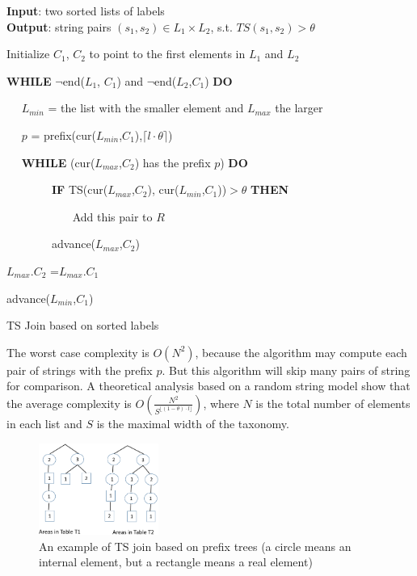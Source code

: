 \begin{algorithm}
{\bf Input}: two sorted lists of labels \\
{\bf Output}: string pairs $(s_1,s_2) \in L_1 \times L_2$, s.t. $TS(s_1, s_2) > \theta$
\begin{compactenum}[(1)]
\item Initialize  $C_1$, $C_2$ to point to the first elements in $L_1$ and $L_2$
\item {\bf WHILE}  $\neg$end($L_1$, $C_1$) and $\neg$end($L_2$,$C_1$) {\bf DO}
\item ~~ $L_{min}$ = the list with the smaller element and $L_{max}$ the larger
\item ~~ $p$ = prefix(cur($L_{min}$,$C_1$),$  \lceil l \cdot \theta \rceil$)
\item ~~ {\bf WHILE} (cur($L_{max}$,$C_2$) has the prefix $p$) {\bf DO}
\item ~~ ~~ ~~ {\bf IF} TS(cur($L_{max}$,$C_2$), cur($L_{min}$,$C_1$))$> \theta$ {\bf THEN}
\item ~~~   ~~ ~~ ~~ Add this pair to $R$
\item ~~ ~~ ~~  advance($L_{max}$,$C_2$)
\item $L_{max}.C_2$ =$L_{max}.C_1$
\item advance($L_{min}$,$C_1$)
\end{compactenum}
\caption{TS Join based on sorted labels}
\label{alg:exactjoin}
\end{algorithm}

The worst case complexity is $O(N^2)$, because the algorithm may compute each pair of strings with the prefix $p$. But this algorithm will skip many pairs of string for comparison. A theoretical analysis based on a random string model show that the average complexity is $O(\frac{N^2}{S^{\lfloor (1-\theta) \cdot l \rfloor}})$, where $N$ is the total number of elements in each list and $S$ is the maximal width of the taxonomy.


\begin{figure}[t]
\centering
\includegraphics[width=0.35\textwidth]{figures/prefixTrees}
 \caption{An example of TS join based on prefix trees (a circle means an internal element, but a rectangle means a real element)}
\label{fig:taxonomyexample}
\end{figure}


